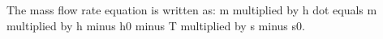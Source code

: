 The mass flow rate equation is written as:  
m multiplied by h dot equals m multiplied by h minus h0 minus T multiplied by s minus s0.